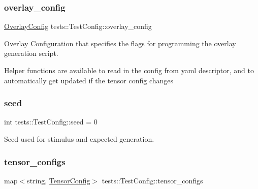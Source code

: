 \mbox{\label{structtests_1_1TestConfig_a985dffa5724992426ad6e6dc8e7fe39b}} 
\subsubsection{\texorpdfstring{overlay\+\_\+config}{overlay\_config}}
{\footnotesize\ttfamily \hyperlink{structtests_1_1OverlayConfig}{Overlay\+Config} tests\+::\+Test\+Config\+::overlay\+\_\+config}



Overlay Configuration that specifies the flags for programming the overlay generation script. 

Helper functions are available to read in the config from yaml descriptor, and to automatically get updated if the tensor config changes \mbox{\label{structtests_1_1TestConfig_a948808f31f8064964a14f33bd2e01068}} 
\subsubsection{\texorpdfstring{seed}{seed}}
{\footnotesize\ttfamily int tests\+::\+Test\+Config\+::seed = 0}



Seed used for stimulus and expected generation. 

\mbox{\label{structtests_1_1TestConfig_a0987a4cdba40e31d224181c17e5c042a}} 
\subsubsection{\texorpdfstring{tensor\+\_\+configs}{tensor\_configs}}
{\footnotesize\ttfamily map$<$string, \hyperlink{structtests_1_1TensorConfig}{Tensor\+Config}$>$ tests\+::\+Test\+Config\+::tensor\+\_\+configs}



